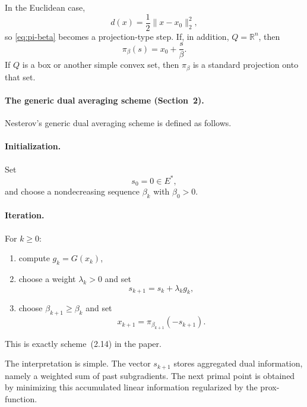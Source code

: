 \documentclass[12pt,a4paper]{article}
\begin{document}
In the Euclidean case,
\begin{equation}
    d(x) = \frac12\|x-x_0\|_2^2,
\end{equation}
so \eqref{eq:pi-beta} becomes a projection-type step. If, in addition, $Q=\mathbb{R}^n$, then
\begin{equation}
    \pi_\beta(s) = x_0 + \frac{s}{\beta}.
\end{equation}
If $Q$ is a box or another simple convex set, then $\pi_\beta$ is a standard projection onto that set.

\paragraph{The generic dual averaging scheme (Section~2).}
Nesterov's generic dual averaging scheme is defined as follows.

\paragraph{Initialization.}
Set
\begin{equation}
    s_0 = 0 \in E^*,
\end{equation}
and choose a nondecreasing sequence $\beta_k$ with $\beta_0>0$.

\paragraph{Iteration.}
For $k \ge 0$:
\begin{enumerate}[leftmargin=1.2cm]
    \item compute $g_k = G(x_k)$,
    \item choose a weight $\lambda_k > 0$ and set
    \begin{equation}
        s_{k+1} = s_k + \lambda_k g_k,
    \end{equation}
    \item choose $\beta_{k+1} \ge \beta_k$ and set
    \begin{equation}
        x_{k+1} = \pi_{\beta_{k+1}}(-s_{k+1}).
    \end{equation}
\end{enumerate}
This is exactly scheme~(2.14) in the paper.

The interpretation is simple. The vector $s_{k+1}$ stores aggregated dual information, namely a weighted sum of past subgradients. The next primal point is obtained by minimizing this accumulated linear information regularized by the prox-function.
\end{document}
